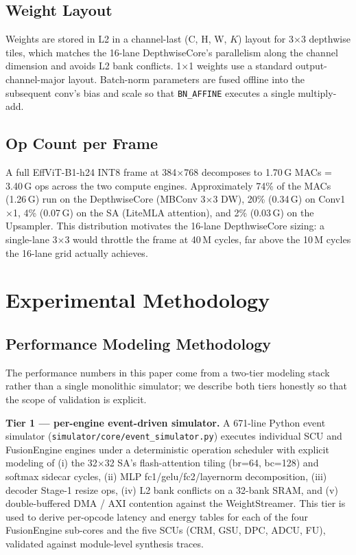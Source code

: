 \documentclass[journal]{IEEEtran}
\begin{document}
\subsection{Weight Layout}
Weights are stored in L2 in a channel-last (C, H, W, $K$) layout for 3$\times$3 depthwise tiles, which matches the 16-lane DepthwiseCore's parallelism along the channel dimension and avoids L2 bank conflicts. 1$\times$1 weights use a standard output-channel-major layout. Batch-norm parameters are fused offline into the subsequent conv's bias and scale so that \texttt{BN\_AFFINE} executes a single multiply-add.

\subsection{Op Count per Frame}
A full EffViT-B1-h24 INT8 frame at 384$\times$768 decomposes to 1.70\,G MACs = 3.40\,G ops across the two compute engines. Approximately 74\% of the MACs (1.26\,G) run on the DepthwiseCore (MBConv 3$\times$3 DW), 20\% (0.34\,G) on Conv1$\times$1, 4\% (0.07\,G) on the SA (LiteMLA attention), and 2\% (0.03\,G) on the Upsampler. This distribution motivates the 16-lane DepthwiseCore sizing: a single-lane 3$\times$3 would throttle the frame at 40\,M cycles, far above the 10\,M cycles the 16-lane grid actually achieves.

\section{Experimental Methodology}
\label{sec:method}

\subsection{Performance Modeling Methodology}
\label{sec:method_perfmodel}

The performance numbers in this paper come from a two-tier modeling stack rather than a single monolithic simulator; we describe both tiers honestly so that the scope of validation is explicit.

\textbf{Tier 1 --- per-engine event-driven simulator.}
A 671-line Python event simulator (\texttt{simulator/core/event\_simulator.py}) executes individual SCU and FusionEngine engines under a deterministic operation scheduler with explicit modeling of (i) the 32$\times$32 SA's flash-attention tiling (br=64, bc=128) and softmax sidecar cycles, (ii) MLP fc1/gelu/fc2/layernorm decomposition, (iii) decoder Stage-1 resize ops, (iv) L2 bank conflicts on a 32-bank SRAM, and (v) double-buffered DMA / AXI contention against the WeightStreamer. This tier is used to derive per-opcode latency and energy tables for each of the four FusionEngine sub-cores and the five SCUs (CRM, GSU, DPC, ADCU, FU), validated against module-level synthesis traces.
\end{document}
